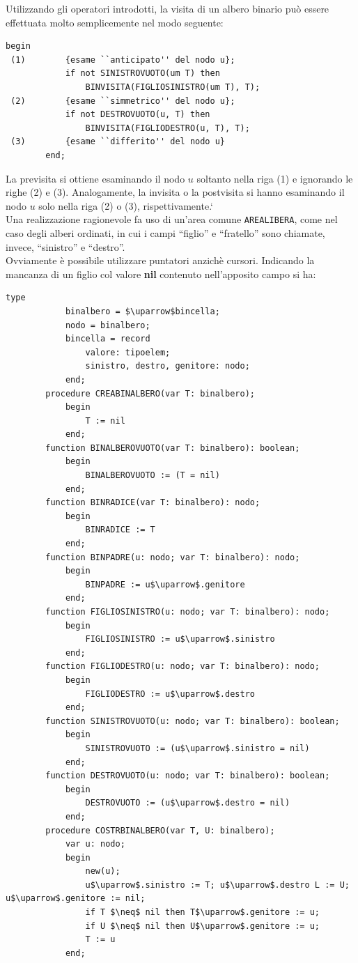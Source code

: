 \documentclass[12pt]{report}
\begin{document}
  	Utilizzando gli operatori introdotti, la visita di un albero binario può essere effettuata molto semplicemente nel modo seguente:
  	\begin{lstlisting}[style=pascalstyle]
  		begin
 (1) 		{esame ``anticipato'' del nodo u};
  			if not SINISTROVUOTO(um T) then
  				BINVISITA(FIGLIOSINISTRO(um T), T);
 (2)		{esame ``simmetrico'' del nodo u};
 			if not DESTROVUOTO(u, T) then
 				BINVISITA(FIGLIODESTRO(u, T), T);
 (3)		{esame ``differito'' del nodo u}
 		end;
  	\end{lstlisting}
  	La previsita si ottiene esaminando il nodo $u$ soltanto nella riga (1) e ignorando le righe (2) e (3). Analogamente, la invisita o la postvisita si hanno esaminando il nodo $u$ solo nella riga (2) o (3), rispettivamente.`\\
  	Una realizzazione ragionevole fa uso di un'area comune \texttt{AREALIBERA}, come nel caso degli alberi ordinati, in cui i campi ``figlio'' e ``fratello'' sono chiamate, invece, ``sinistro'' e ``destro''. \\
  	Ovviamente è possibile utilizzare puntatori anzichè cursori. Indicando la mancanza di un figlio col valore \textbf{nil} contenuto nell'apposito campo si ha:
  	\begin{lstlisting}[style=pascalstyle, mathescape]
  		type
  			binalbero = $\uparrow$bincella;
  			nodo = binalbero;
  			bincella = record
  				valore: tipoelem;
  				sinistro, destro, genitore: nodo;
  			end;
  		procedure CREABINALBERO(var T: binalbero);
  			begin
  				T := nil
  			end;
  		function BINALBEROVUOTO(var T: binalbero): boolean;
  			begin
  				BINALBEROVUOTO := (T = nil)
  			end;
  		function BINRADICE(var T: binalbero): nodo;
  			begin
  				BINRADICE := T
  			end;
  		function BINPADRE(u: nodo; var T: binalbero): nodo;
  			begin
  				BINPADRE := u$\uparrow$.genitore
  			end;
  		function FIGLIOSINISTRO(u: nodo; var T: binalbero): nodo;
  			begin
  				FIGLIOSINISTRO := u$\uparrow$.sinistro
  			end;
  		function FIGLIODESTRO(u: nodo; var T: binalbero): nodo;
  			begin
  				FIGLIODESTRO := u$\uparrow$.destro
  			end;
  		function SINISTROVUOTO(u: nodo; var T: binalbero): boolean;
  			begin
  				SINISTROVUOTO := (u$\uparrow$.sinistro = nil)
  			end;
  		function DESTROVUOTO(u: nodo; var T: binalbero): boolean;
  			begin
  				DESTROVUOTO := (u$\uparrow$.destro = nil)
  			end;
  		procedure COSTRBINALBERO(var T, U: binalbero);
  			var u: nodo;
  			begin
  				new(u);
  				u$\uparrow$.sinistro := T; u$\uparrow$.destro L := U; u$\uparrow$.genitore := nil;
  				if T $\neq$ nil then T$\uparrow$.genitore := u;
  				if U $\neq$ nil then U$\uparrow$.genitore := u;
  				T := u
  			end;
  	\end{lstlisting}
\end{document}
